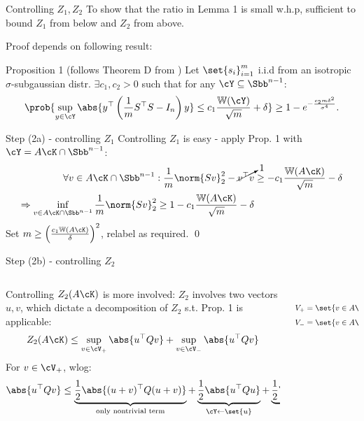 \documentclass[10pt]{beamer}
\begin{document}
\begin{frame}{Controlling $Z_1, Z_2$}
    To show that the ratio in Lemma 1 is small w.h.p, sufficient to bound $Z_1$
    from below and $Z_2$ from above.

    Proof depends on following result:
    \begin{block}{Proposition 1 (follows Theorem D from \cite{MenPajTom07})}
        Let $\set{s_i}_{i=1}^m$ i.i.d from an isotropic $\sigma$-subgaussian
        distr. $\exists c_1, c_2 > 0$ such that for any
        $ \cY \subseteq \Sbb^{n - 1} $:
        \[
            \prob{\sup_{y \in \cY} \abs{y^\top \left(\frac{1}{m} S^\top S - I_n
            \right) y} \leq c_1 \frac{\mathbb{W}(\cY)}{\sqrt{m}} + \delta}
            \geq 1 - e^{-\frac{c_2 m \delta^2}{\sigma^4}}.
        \]
    \end{block}
\end{frame}

\begin{frame}{Step (2a) - controlling $Z_1$ }
    Controlling $Z_1$ is easy - apply Prop. 1 with $\cY = A\cK \cap \Sbb^{n-1}$:
    \begin{align*}
        \forall v \in A \cK \cap \Sbb^{n-1}:
        \frac{1}{m} \norm{Sv}^2_2 - \cancelto{1}{v^\top v}
        & \geq - c_1 \frac{\mathbb{W}(A \cK)}{\sqrt{m}} - \delta \\
        \Rightarrow
        \inf_{v \in A\cK \cap \Sbb^{n-1}} \frac{1}{m} \norm{Sv}_2^2 \geq 1 -
        c_1 \frac{\mathbb{W}(A
        \cK)}{\sqrt{m}} - \delta
    \end{align*}
    Set $m \geq \left( \frac{c_1 \mathbb{W}(A \cK)}{\delta} \right)^2$, relabel
    as required. \qed
\end{frame}

\begin{frame}{Step (2b) - controlling $Z_2$}
\begin{columns}
    \begin{column}{0.75 \textwidth}
    Controlling $Z_2(A \cK)$ is more involved: $Z_2$ involves two vectors $u,
    v$, which dictate a decomposition of $Z_2$ s.t. Prop. 1 is applicable:
    \[
        Z_2(A \cK) \leq \sup_{v \in \cV_+} \abs{u^\top Q v} +
        \sup_{v \in \cV_-} \abs{u^\top Q v}
    \]
    For $v \in \cV_+$, wlog:
    \[
        \abs{u^\top Q v} \leq
        \underbrace{\frac{1}{2} \abs{(u + v)^\top Q (u + v)}}_{
            \text{only nontrivial term}}
        + \underbrace{\frac{1}{2} \abs{u^\top Q u}}_{\cY \gets \set{u}} +
        \underbrace{\frac{1}{2} \abs{v^\top Q v}}_{\cY \gets \cV_+}
    \]
    \end{column}
    \vrule{}
    \begin{column}{0.24 \textwidth}
        \begin{align*}
            \scalebox{0.8}{$Q := \frac{S^\top S}{m} - I_n$} \\
            \scalebox{0.8}{$V_+ = \set{v \in A \cK : \ip{u, v} \geq 0}$} \\
            \scalebox{0.8}{$V_- = \set{v \in A \cK : \ip{u, v} < 0}$}
        \end{align*}
    \end{column}
\end{columns}
\end{frame}
\end{document}
